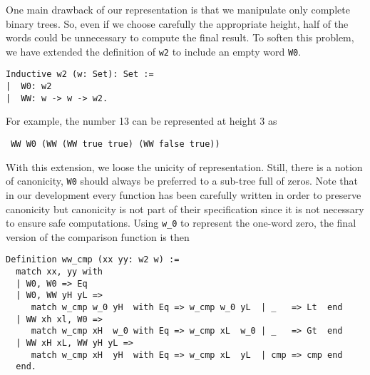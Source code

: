 One main drawback of our representation is that we manipulate only complete 
binary trees. 
So, even if we choose carefully the appropriate height, half of the words 
could be unnecessary to compute the final result. 
To soften this problem, we have extended the definition of {\tt w2} 
to include an empty word {\tt W0}. 
\begin{verbatim}
Inductive w2 (w: Set): Set :=  
|  W0: w2
|  WW: w -> w -> w2.
\end{verbatim}
For example, the number 13 can be represented at height 3 as
\begin{verbatim}
 WW W0 (WW (WW true true) (WW false true))
\end{verbatim}
With this extension, we loose the unicity of representation. Still, there is a notion
of canonicity, {\tt W0} should always be preferred to a sub-tree full of zeros. Note that in
our development every function has been carefully written in order to preserve canonicity but
canonicity  is not part of their specification since it is not necessary to ensure safe computations.
Using {\tt w\_0} to represent the one-word zero, 
the final version of the comparison function is then
\begin{verbatim}
Definition ww_cmp (xx yy: w2 w) :=
  match xx, yy with
  | W0, W0 => Eq
  | W0, WW yH yL =>
     match w_cmp w_0 yH  with Eq => w_cmp w_0 yL  | _   => Lt  end
  | WW xh xl, W0 =>
     match w_cmp xH  w_0 with Eq => w_cmp xL  w_0 | _   => Gt  end
  | WW xH xL, WW yH yL =>
     match w_cmp xH  yH  with Eq => w_cmp xL  yL  | cmp => cmp end
  end.
\end{verbatim}


